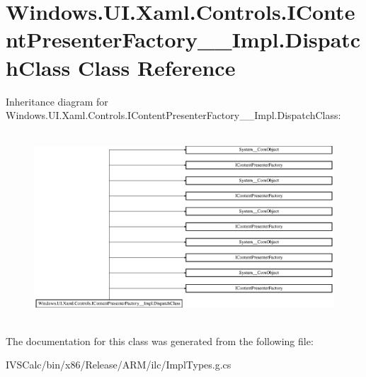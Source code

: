 \hypertarget{class_windows_1_1_u_i_1_1_xaml_1_1_controls_1_1_i_content_presenter_factory_____impl_1_1_dispatch_class}{}\section{Windows.\+U\+I.\+Xaml.\+Controls.\+I\+Content\+Presenter\+Factory\+\_\+\+\_\+\+Impl.\+Dispatch\+Class Class Reference}
\label{class_windows_1_1_u_i_1_1_xaml_1_1_controls_1_1_i_content_presenter_factory_____impl_1_1_dispatch_class}
Inheritance diagram for Windows.\+U\+I.\+Xaml.\+Controls.\+I\+Content\+Presenter\+Factory\+\_\+\+\_\+\+Impl.\+Dispatch\+Class\+:\begin{figure}[H]
\begin{center}
\leavevmode
\includegraphics[height=7.048055cm]{class_windows_1_1_u_i_1_1_xaml_1_1_controls_1_1_i_content_presenter_factory_____impl_1_1_dispatch_class}
\end{center}
\end{figure}


The documentation for this class was generated from the following file\+:\begin{DoxyCompactItemize}
\item 
I\+V\+S\+Calc/bin/x86/\+Release/\+A\+R\+M/ilc/Impl\+Types.\+g.\+cs\end{DoxyCompactItemize}
